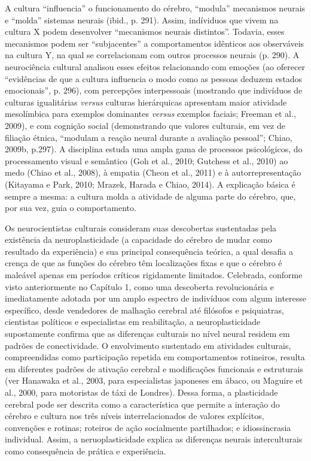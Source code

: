 A cultura ``influencia'' o funcionamento do cérebro, ``modula''
mecanismos neurais e ``molda'' sistemas neurais (ibid., p. 291). Assim,
indíviduos que vivem na cultura X podem desenvolver ``mecanismos neurais
distintos''. Todavia, esses mecanismos podem ser ``subjacentes'' a
comportamentos idênticos aos observáveis na cultura Y, na qual se
correlacionam com outros processos neurais (p. 290). A neurociência
cultural analisou esses efeitos relacionando com emoções (ao oferecer
``evidências de que a cultura influencia o modo como as pessoas deduzem
estados emocionais'', p. 296), com percepções interpessoais (mostrando
que indivíduos de culturas igualitárias \emph{versus} culturas
hierárquicas apresentam maior atividade mesolímbica para exemplos
dominantes \emph{versus} exemplos faciais; Freeman et al., 2009), e com
cognição social (demonstrando que valores culturais, em vez de filiação
étnica, ``modulam a reação neural durante a avaliação pessoal''; Chiao,
2009b, p.297). A disciplina estuda uma ampla gama de processos
psicológicos, do processamento visual e semântico (Goh et al., 2010;
Gutchess et al., 2010) ao medo (Chiao et al., 2008), à empatia (Cheon et
al., 2011) e à autorrepresentação (Kitayama e Park, 2010; Mrazek, Harada
e Chiao, 2014). A explicação básica é sempre a mesma: a cultura molda a
atividade de alguma parte do cérebro, que, por sua vez, guia o
comportamento.

Os neurocientistas culturais consideram suas descobertas sustentadas
pela existência da neuroplasticidade (a capacidade do cérebro de mudar
como resultado da experiência) e sua principal consequência teórica, a
qual desafia a crença de que as funções do cérebro têm localizações
fixas e que o cérebro é maleável apenas em períodos críticos rigidamente
limitados. Celebrada, conforme visto anteriormente no Capítulo 1, como
uma descoberta revolucionária e imediatamente adotada por um amplo
espectro de indivíduos com algum interesse específico, desde vendedores
de malhação cerebral até filósofos e psiquiatras, cientistas políticos e
especialistas em reabilitação, a neuroplasticidade supostamente confirma
que as diferenças culturais no nível neural residem em padrões de
conectividade. O envolvimento sustentado em atividades culturais,
compreendidas como participação repetida em comportamentos rotineiros,
resulta em diferentes padrões de ativação cerebral e modificações
funcionais e estruturais (ver Hanawaka et al., 2003, para especialistas
japoneses em ábaco, ou Maguire et al., 2000, para motoristas de táxi de
Londres). Dessa forma, a plasticidade cerebral pode ser descrita como a
característica que permite a interação do cérebro e cultura nos três
níveis interrelacionados de valores explícitos, convenções e rotinas;
roteiros de ação socialmente partilhados; e idiossincrasia individual.
Assim, a neruoplasticidade explica as diferenças neurais interculturais
como consequência de prática e experiência.

